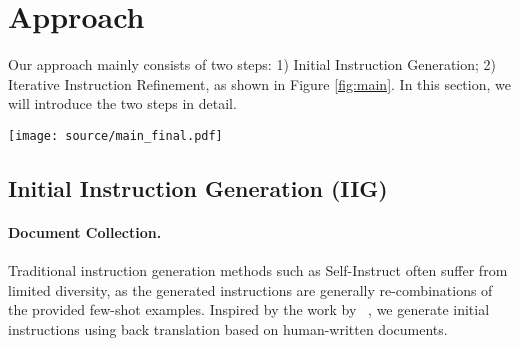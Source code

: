 \section{Approach}

Our approach mainly consists of two steps: 1) Initial Instruction Generation; 2) Iterative Instruction Refinement, as shown in Figure \ref{fig:main}. In this section, we will introduce the two steps in detail.

\begin{figure*}[!t]
    \centering %
    \texttt{[image: source/main\_final.pdf]}
    \vspace{-3mm}
    \caption{
     \textbf{AIR}: Automatic Iterative Refinement Framework. 
    }
    \vspace{-5mm}
    \label{fig:main}
\end{figure*}

\subsection{Initial Instruction Generation (IIG)}

\paragraph{Document Collection.}
Traditional instruction generation methods such as Self-Instruct \cite{wang2022self} often suffer from limited diversity, as the generated instructions are generally re-combinations of the provided few-shot examples. Inspired by the work by ~\citet{li2023self}, we generate initial instructions using back translation based on human-written documents.



